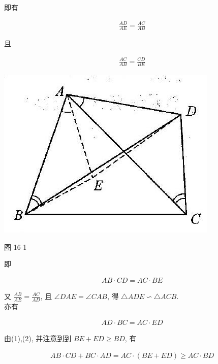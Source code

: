 \documentclass[10pt]{article}
\begin{document}
即有

\begin{align*}
\frac{A D}{A E}=\frac{A C}{A B}
\end{align*}

且

\begin{align*}
\frac{A C}{A B}=\frac{C D}{B E}
\end{align*}

\begin{center}
\includegraphics[max width=\textwidth]{2024_10_30_2c8f45efd4a519b08e1ag-146}
\end{center}

图 16-1

即

\begin{align*}
A B \cdot C D=A C \cdot B E \tag{1}
\end{align*}

又 $\frac{A B}{A E}=\frac{A C}{A D}$, 且 $\angle D A E=\angle C A B$, 得 $\triangle A D E \backsim \triangle A C B$.\\
亦有

\begin{align*}
A D \cdot B C=A C \cdot E D \tag{2}
\end{align*}

由(1),(2), 并注意到到 $B E+E D \geqslant B D$, 有

\begin{align*}
A B \cdot C D+B C \cdot A D=A C \cdot(B E+E D) \geqslant A C \cdot B D
\end{align*}
\end{document}
